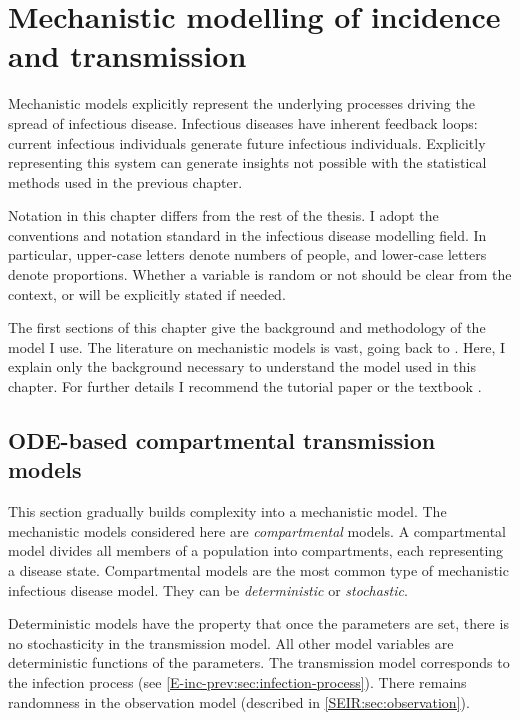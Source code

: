 \documentclass[thesis.tex]{subfiles}
\begin{document}
\ifSubfilesClassLoaded{
    \setcounter{chapter}{7}
}
\chapter{Mechanistic modelling of incidence and transmission} \label{SEIR}

Mechanistic models explicitly represent the underlying processes driving the spread of infectious disease.
Infectious diseases have inherent feedback loops: current infectious individuals generate future infectious individuals.
Explicitly representing this system can generate insights not possible with the statistical methods used in the previous chapter.

Notation in this chapter differs from the rest of the thesis.
I adopt the conventions and notation standard in the infectious disease modelling field.
In particular, upper-case letters denote numbers of people, and lower-case letters denote proportions.
Whether a variable is random or not should be clear from the context, or will be explicitly stated if needed.

The first sections of this chapter give the background and methodology of the model I use.
The literature on mechanistic models is vast, going back to \textcite{kermackContribution}.
Here, I explain only the background necessary to understand the model used in this chapter.
For further details I recommend the tutorial paper \textcite{kretzschmarMathematical} or the textbook \textcite{keelingModeling}.

\section{ODE-based compartmental transmission models} \label{SEIR:sec:transmission}

This section gradually builds complexity into a mechanistic model.
The mechanistic models considered here are \emph{compartmental} models.
A compartmental model divides all members of a population into compartments, each representing a disease state.
Compartmental models are the most common type of mechanistic infectious disease model.
They can be \emph{deterministic} or \emph{stochastic}.

Deterministic models have the property that once the parameters are set, there is no stochasticity in the transmission model.
All other model variables are deterministic functions of the parameters.
The transmission model corresponds to the infection process (see \cref{E-inc-prev:sec:infection-process}).
There remains randomness in the observation model (described in \cref{SEIR:sec:observation}).
\end{document}
